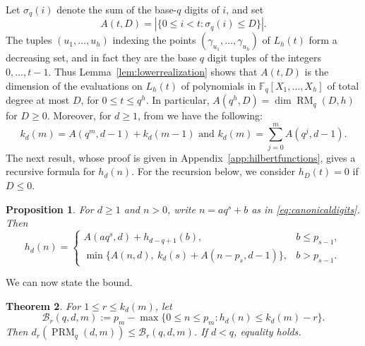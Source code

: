 \documentclass[11pt]{amsart}
\newtheorem{theorem}{Theorem}[section]
\newtheorem{proposition}[theorem]{Proposition}
\theoremstyle{definition}
\newcommand{\F}{\mathbb F}
\newcommand{\PRM}{\operatorname{PRM}}
\newcommand{\RM}{\operatorname{RM}}
\newcommand{\card}[1]{\left|#1\right|}
\numberwithin{equation}{section}
\begin{document}
Let $\sigma_q(i)$ denote the
sum of the base-$q$ digits of $i$, and set 
\[
 A(t,D)=\card{\{0\le i<t:\sigma_q(i)\le D\}}.
\]
The tuples $(u_1,\ldots,u_h)$ indexing the points
$(\gamma_{u_1},\ldots,\gamma_{u_h})$ of $L_h(t)$ form a
decreasing set, and in fact they are the base $q$ digit tuples of the integers $0,\dots,t-1$.
Thus Lemma~\ref{lem:lowerrealization} shows that $A(t,D)$ is the
dimension of the evaluations on $L_h(t)$ of polynomials in
$\F_q[X_1,\ldots,X_h]$ of total degree at most $D$, for
$0\le t\le q^h$.
In particular, $A(q^h,D)=\dim\RM_q(D,h)$ for $D\ge0$. Moreover, for $d\geq 1$, from \cite[Cor. 1]{SanJose} we have the following: 
\[
k_d(m)=A(q^m,d-1)+k_d(m-1) \text{ and } k_d(m)=\sum_{j=0}^m A(q^j,d-1).
\]
The next result, whose proof is given in
Appendix~\ref{app:hilbertfunctions}, gives a recursive formula for $h_d(n)$. For the recursion below, we consider $h_D(t)=0$ if $D\le0$.

\begin{proposition}\label{prop:canonicalfamilies}
For $d\ge1$ and $n>0$, write $n=aq^s+b$ as in
\eqref{eq:canonicaldigits}. Then
\begin{equation}\label{eq:canonicalprofile}
 h_d(n)=
 \begin{cases}
 A(aq^s,d)+h_{d-q+1}(b),&b\le p_{s-1},\\[1mm]
 \min\{A(n,d),\ k_d(s)+A(n-p_s,d-1)\},&b>p_{s-1}.
 \end{cases}
\end{equation}
\end{proposition}

We can now state the bound. 

\begin{theorem}\label{prop:generalbound}
For $1\le r\le k_d(m)$, let
\begin{equation}\label{eq:generalbound}
 \mathcal B_r(q,d,m):=p_m-
       \max\{0\le n\le p_m:h_d(n)\le k_d(m)-r\}.
\end{equation}
Then $d_r(\PRM_q(d,m))\le\mathcal B_r(q,d,m)$.
If $d<q$, equality holds.
\end{theorem}
\end{document}
